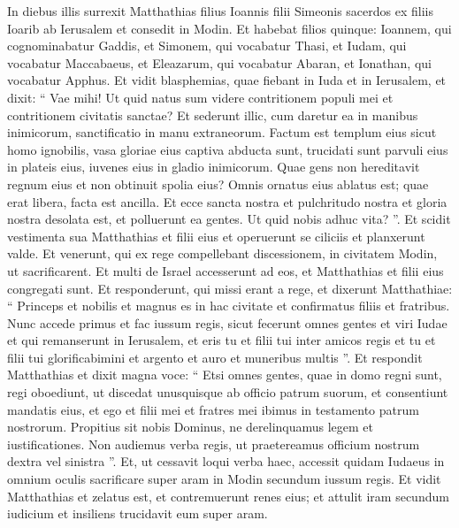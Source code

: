 \begin{biblechapter}
\begin{biblechapter}
\verse In diebus illis surrexit Matthathias filius Ioannis filii Simeonis sacerdos ex filiis Ioarib ab Ierusalem et consedit in Modin. 
\verse Et habebat filios quinque: Ioannem, qui cognominabatur Gaddis, 
\verse et Simonem, qui vocabatur Thasi, 
\verse et Iudam, qui vocabatur Maccabaeus, 
\verse et Eleazarum, qui vocabatur Abaran, et Ionathan, qui vocabatur Apphus.
 \verse Et vidit blasphemias, quae fiebant in Iuda et in Ierusalem, 
\verse et dixit: “ Vae mihi! Ut quid natus sum videre contritionem populi mei et contritionem civitatis sanctae? Et sederunt illic, cum daretur ea in manibus inimicorum, sanctificatio in manu extraneorum. 
\verse Factum est templum eius sicut homo ignobilis, 
\verse vasa gloriae eius captiva abducta sunt, trucidati sunt parvuli eius in plateis eius, iuvenes eius in gladio inimicorum. 
\verse Quae gens non hereditavit regnum eius et non obtinuit spolia eius? 
\verse Omnis ornatus eius ablatus est; quae erat libera, facta est ancilla. 
\verse Et ecce sancta nostra et pulchritudo nostra et gloria nostra desolata est, et polluerunt ea gentes. 
 \verse Ut quid nobis adhuc vita? ”. 
\verse Et scidit vestimenta sua Matthathias et filii eius et operuerunt se ciliciis et planxerunt valde.
 \verse Et venerunt, qui ex rege compellebant discessionem, in civitatem Modin, ut sacrificarent. 
\verse Et multi de Israel accesserunt ad eos, et Matthathias et filii eius congregati sunt. 
\verse Et responderunt, qui missi erant a rege, et dixerunt Matthathiae: “ Princeps et nobilis et magnus es in hac civitate et confirmatus filiis et fratribus. 
\verse Nunc accede primus et fac iussum regis, sicut fecerunt omnes gentes et viri Iudae et qui remanserunt in Ierusalem, et eris tu et filii tui inter amicos regis et tu et filii tui glorificabimini et argento et auro et muneribus multis ”. 
\verse Et respondit Matthathias et dixit magna voce: “ Etsi omnes gentes, quae in domo regni sunt, regi oboediunt, ut discedat unusquisque ab officio patrum suorum, et consentiunt mandatis eius, 
 \verse et ego et filii mei et fratres mei ibimus in testamento patrum nostrorum. 
 \verse Propitius sit nobis Dominus, ne derelinquamus legem et iustificationes. 
 \verse Non audiemus verba regis, ut praetereamus officium nostrum dextra vel sinistra ”. 
\verse Et, ut cessavit loqui verba haec, accessit quidam Iudaeus in omnium oculis sacrificare super aram in Modin secundum iussum regis. 
\verse Et vidit Matthathias et zelatus est, et contremuerunt renes eius; et attulit iram secundum iudicium et insiliens trucidavit eum super aram. 

\end{biblechapter}
\end{biblechapter}
